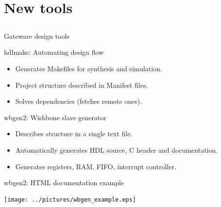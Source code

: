 \documentclass[compress,red]{beamer}
\begin{document}
\section{New tools}

\subsection*{} %

\begin{frame}{Gateware design tools}

  \begin{block}{hdlmake: Automating design flow}
    \begin{itemize}
    \item Generates Makefiles for synthesis and simulation.
    \item Project structure described in Manifest files.
    \item Solves dependencies (fetches remote ones).
    \end{itemize}
  \end{block}

  \begin{block}{wbgen2: Wishbone slave generator}
    \begin{itemize}
    \item Describes structure in a single text file.
    \item Automatically generates HDL source, C header and documentation.
    \item Generates registers, RAM, FIFO, interrupt controller.
    \end{itemize}
  \end{block}


\end{frame}

\begin{frame}{wbgen2: HTML documentation example}

  \begin{center}
    \texttt{[image: ../pictures/wbgen\_example.eps]}
  \end{center}


\end{frame}
\end{document}
